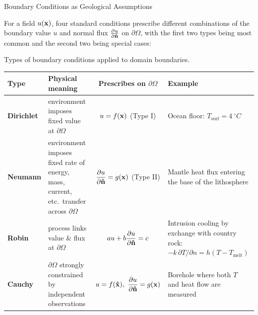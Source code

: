 \begin{activity}{Boundary Conditions as Geological Assumptions}
{\begin{center}
    \end{center}

    For a field $u(\vb{x})$, four standard conditions prescribe different combinations of the boundary value $u$ and normal flux $\pdv{u}{\vu{n}}$ on $\partial\Omega$, with the first two types being most common and the second two being special cases:

    \begin{center}
    Types of boundary conditions applied to domain boundaries.
    \begin{tabularx}{\textwidth}{@{}lXcX@{}}
        \toprule
        \textbf{Type} & \textbf{Physical meaning} & \textbf{Prescribes on $\partial\Omega$} & \textbf{Example} \\
        \midrule
        \textbf{Dirichlet} &
        environment imposes fixed value at $\partial\Omega$ &
        $u = f(\vb{x})$ (Type I)&
        Ocean floor: $T_\text{surf} = \SI{4}{^\circ C}$ \\
        \textbf{Neumann} &
        environment imposes fixed rate of energy, mass, current, etc.\ transfer across $\partial\Omega$ &
        $\displaystyle{\pdv{u}{\vu{n}}} = g(\mathbf{x})$ (Type II) &
        Mantle heat flux entering the base of the lithosphere \\
        \textbf{Robin} &
        process links value \& flux at $\partial\Omega$ &
        $au + b \displaystyle{\pdv{u}{\vu{n}}} = c$ &
        Intrusion cooling by exchange with country rock:
        $-k\,\partial T/\partial n = h(T-T_\text{melt})$ \\
        \textbf{Cauchy} &
        $\partial\Omega$ strongly constrained by independent observations &
        $u = f(\vu{x}),\ \displaystyle{\pdv{u}{\vu{n}}}=g(\mathbf{x})$ &
        Borehole where both $T$ and heat flow are measured \\
        \bottomrule
    \end{tabularx}
    \end{center}

}
\end{activity}
